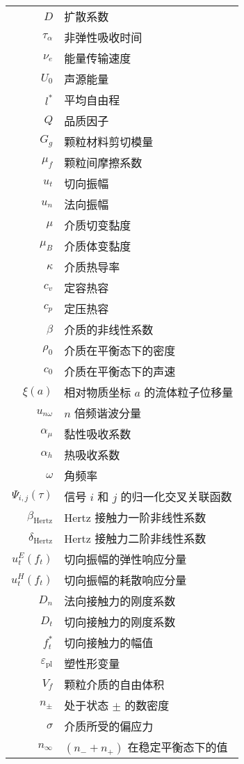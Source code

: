 \begin{nomenclature*}
\begin{longtable}{rl}
  
  $D$ & 扩散系数\\
  $\tau_{\alpha}$ & 非弹性吸收时间\\
  $\nu_{e}$ & 能量传输速度\\
  $U_{0}$ & 声源能量\\
  $l^{*}$ & 平均自由程\\
  $Q$ & 品质因子\\
  $G_{g}$ & 颗粒材料剪切模量\\
  $\mu_{f}$ & 颗粒间摩擦系数\\
  $u_{t}$ & 切向振幅\\
  $u_{n}$ & 法向振幅\\
  $\mu$ & 介质切变黏度\\
  $\mu_{B}$ & 介质体变黏度\\
  $\kappa$ & 介质热导率\\
  $c_{v}$ & 定容热容\\
  $c_{p}$ & 定压热容\\
  $\beta$ & 介质的非线性系数\\
  $\rho_{0}$ & 介质在平衡态下的密度\\
  $c_{0}$ & 介质在平衡态下的声速\\
  $\xi(a)$ & 相对物质坐标 $a$ 的流体粒子位移量\\
  $u_{n\omega}$ & $n$ 倍频谐波分量\\
  $\alpha_{\mu}$ & 黏性吸收系数\\
  $\alpha_{h}$ & 热吸收系数\\
  $\omega$ & 角频率\\
  $\Psi_{i,j}(\tau)$ & 信号 $i$ 和 $j$ 的归一化交叉关联函数\\
  $\beta_{\text{Hertz}}$ & Hertz 接触力一阶非线性系数\\
  $\delta_{\text{Hertz}}$ & Hertz 接触力二阶非线性系数\\
  $u_{t}^{E}(f_{t})$ & 切向振幅的弹性响应分量\\
  $u_{t}^{H}(f_{t})$ & 切向振幅的耗散响应分量\\
  $D_{n}$ & 法向接触力的刚度系数\\
  $D_{t}$ & 切向接触力的刚度系数\\
  $f_{t}^{*}$ & 切向接触力的幅值\\

  $\varepsilon_{\text{pl}}$ & 塑性形变量\\
  $V_{f}$ & 颗粒介质的自由体积\\
  $n_{\pm}$ & 处于状态 $\pm$ 的数密度\\
  $\sigma$ & 介质所受的偏应力\\
  $n_{\infty}$ & $(n_{-} + n_{+})$ 在稳定平衡态下的值\\

\end{longtable}

\end{nomenclature*}
